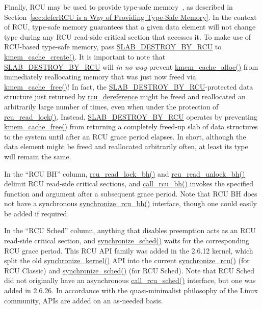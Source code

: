 Finally, RCU may be used to provide
type-safe memory~\cite{Cheriton96a}, as described in
Section~\ref{sec:deferRCU is a Way of Providing Type-Safe Memory}.
In the context of RCU, type-safe memory guarantees that a given
data element will not change type during any RCU read-side critical section
that accesses it.
To make use of RCU-based type-safe memory, pass
\url{SLAB_DESTROY_BY_RCU} to
\url{kmem_cache_create()}.
It is important to note that \url{SLAB_DESTROY_BY_RCU} will
\emph{in no way}
prevent \url{kmem_cache_alloc()} from immediately reallocating
memory that was just now freed via \url{kmem_cache_free()}!
In fact, the \url{SLAB_DESTROY_BY_RCU}-protected data structure
just returned by \url{rcu_dereference} might be freed and reallocated
an arbitrarily large number of times, even when under the protection
of \url{rcu_read_lock()}.
Instead, \url{SLAB_DESTROY_BY_RCU} operates by preventing
\url{kmem_cache_free()}
from returning a completely freed-up slab of data structures
to the system until after an RCU grace period elapses.
In short, although the data element might be freed and reallocated arbitrarily
often, at least its type will remain the same.

In the ``RCU BH'' column, \url{rcu_read_lock_bh()} and
\url{rcu_read_unlock_bh()} delimit RCU read-side critical
sections, and \url{call_rcu_bh()} invokes the specified
function and argument after a subsequent grace period.
Note that RCU BH does not have a synchronous \url{synchronize_rcu_bh()}
interface,
though one could easily be added if required.

 \QuickQuizEnd

In the ``RCU Sched'' column, anything that disables preemption
acts as an RCU read-side critical section, and \url{synchronize_sched()}
waits for the corresponding RCU grace period.
This RCU API family was added in the 2.6.12 kernel, which split the
old \url{synchronize_kernel()} API into the current
\url{synchronize_rcu()} (for RCU Classic) and
\url{synchronize_sched()} (for RCU Sched).
Note that RCU Sched did not originally have an asynchronous
\url{call_rcu_sched()} interface, but one was added in 2.6.26.
In accordance with the quasi-minimalist philosophy of the Linux
community, APIs are added on an as-needed basis.

